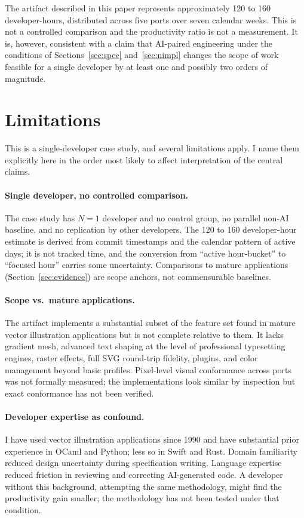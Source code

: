 \documentclass[10pt]{article}
\begin{document}
The artifact described in this paper represents approximately 120 to 160
developer-hours, distributed across five ports over seven calendar
weeks. This is not a controlled comparison and the productivity ratio is
not a measurement. It is, however, consistent with a claim that
AI-paired engineering under the conditions of Sections~\ref{sec:spec}
and~\ref{sec:nimpl} changes the scope of work feasible for a single
developer by at least one and possibly two orders of magnitude.

\section{Limitations}
\label{sec:limits}

This is a single-developer case study, and several limitations apply. I
name them explicitly here in the order most likely to affect
interpretation of the central claims.

\paragraph{Single developer, no controlled comparison.} The case study
has $N=1$ developer and no control group, no parallel non-AI baseline,
and no replication by other developers. The 120 to 160 developer-hour
estimate is derived from commit timestamps and the calendar pattern of
active days; it is not tracked time, and the conversion from ``active
hour-bucket'' to ``focused hour'' carries some uncertainty. Comparisons
to mature applications (Section~\ref{sec:evidence}) are scope anchors,
not commensurable baselines.

\paragraph{Scope vs.\ mature applications.} The artifact implements a
substantial subset of the feature set found in mature vector
illustration applications but is not complete relative to them. It lacks
gradient mesh, advanced text shaping at the level of professional
typesetting engines, raster effects, full SVG round-trip fidelity,
plugins, and color management beyond basic profiles. Pixel-level visual
conformance across ports was not formally measured; the implementations
look similar by inspection but exact conformance has not been verified.

\paragraph{Developer expertise as confound.} I have used vector
illustration applications since 1990 and have substantial prior
experience in OCaml and Python; less so in Swift and Rust. Domain
familiarity reduced design uncertainty during specification writing.
Language expertise reduced friction in reviewing and correcting
AI-generated code. A developer without this background, attempting the
same methodology, might find the productivity gain smaller; the
methodology has not been tested under that condition.
\end{document}
